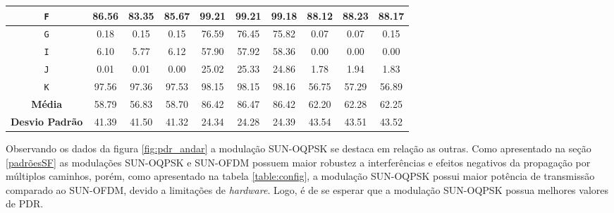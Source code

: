 \begin{table}[ht]
\begin{tabular}{|c|c|c|c|c|c|c|c|c|c|}
        \texttt{F}             & 86.56                                 & 83.35                                   & 85.67                                  & 99.21          & 99.21          & 99.18          & 88.12          & 88.23          & 88.17          \\ \hline
        \texttt{G}             & 0.18                                  & 0.15                                    & 0.15                                   & 76.59          & 76.45          & 75.82          & 0.07           & 0.07           & 0.15           \\ \hline
        \texttt{I}             & 6.10                                  & 5.77                                    & 6.12                                   & 57.90          & 57.92          & 58.36          & 0.00           & 0.00           & 0.00           \\ \hline
        \texttt{J}             & 0.01                                  & 0.01                                    & 0.00                                   & 25.02          & 25.33          & 24.86          & 1.78           & 1.94           & 1.83           \\ \hline
        \texttt{K}             & 97.56                                 & 97.36                                   & 97.53                                  & 98.15          & 98.15          & 98.16          & 56.75          & 57.29          & 56.89          \\ \hline
        \textbf{Média}         & 58.79                                 & 56.83                                   & 58.70                                  & 86.42          & 86.47          & 86.42          & 62.20          & 62.28          & 62.25          \\ \hline
        \textbf{Desvio Padrão} & 41.39                                 & 41.50                                   & 41.32                                  & 24.34          & 24.28          & 24.39          & 43.54          & 43.51          & 43.52          \\ \hline
    \end{tabular}
    \label{table:pdr}
\end{table}

Observando os dados da figura \ref{fig:pdr_andar} a modulação SUN-OQPSK se destaca em relação as outras. Como apresentado na seção \ref{padrõesSF} as modulações SUN-OQPSK e SUN-OFDM possuem maior robustez a interferências e efeitos negativos da propagação por múltiplos caminhos, porém, como apresentado na tabela \ref{table:config}, a modulação SUN-OQPSK possui maior potência de transmissão comparado ao SUN-OFDM, devido a limitações de \emph{hardware}. Logo, é de se esperar que a modulação SUN-OQPSK possua melhores valores de PDR.


